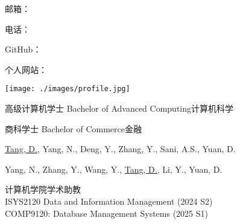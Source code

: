\documentclass[11pt]{article}
\begin{document}
\hspace{10pt}
\begin{minipage}[t]{0.7\textwidth}
  \hspace{-40pt}
  {\Huge \MyNameCN}

  \vspace{1em}
  \hspace{-40pt}
  邮箱：\MyEmail 

  \hspace{-40pt}
	电话：\MyPhone 

  \hspace{-40pt}
	GitHub：\href{\MyGitHub}{\MyGitHub}

  \hspace{-40pt}
	个人网站：\href{\MyWebsite}{\MyWebsite}
\end{minipage}
\begin{minipage}[t]{0.2\textwidth}
  \vspace{-35pt} %
  \texttt{[image: ./images/profile.jpg]} 
\end{minipage}
\hfill

\vspace{1em}


{高级计算机学士 Bachelor of Advanced Computing}{计算机科学}

{商科学士 Bachelor of Commerce}{金融}


{\underline{Tang, D.}, Yang, N., Deng, Y., Zhang, Y., Sani, A.S., Yuan, D.}

{Yang, N., Zhang, Y., Wang, Y., \underline{Tang, D.}, Li, Y., Yuan, D.}


{计算机学院学术助教}
{\\
ISYS2120 Data and Information Management (2024 S2) \\
COMP9120: Database Management Systems (2025 S1)
}
\end{document}
